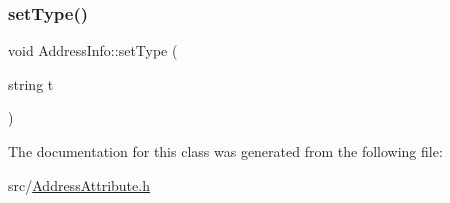 \mbox{\label{classAddressInfo_a024ac80e1b8a35625cb77d6a4c8e6b0e}} 
\subsubsection{\texorpdfstring{set\+Type()}{setType()}}
{\footnotesize\ttfamily void Address\+Info\+::set\+Type (\begin{DoxyParamCaption}\item[{string}]{t }\end{DoxyParamCaption})}



The documentation for this class was generated from the following file\+:\begin{DoxyCompactItemize}
\item 
src/\hyperlink{AddressAttribute_8h}{Address\+Attribute.\+h}\end{DoxyCompactItemize}
